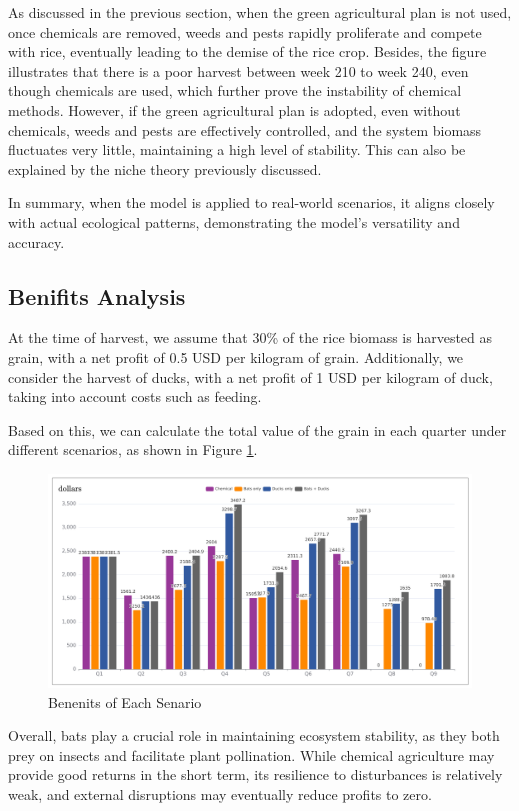 \documentclass{HZNUMCM}
\begin{document}
          As discussed in the previous section, 
          when the green agricultural plan is not used, once chemicals are removed, 
          weeds and pests rapidly proliferate and compete with rice, eventually leading to the demise of the rice crop. 
          Besides, the figure illustrates that there is a poor harvest between week 210 to week 240, even though chemicals are used, 
          which further prove the instability of chemical methods.
          However, if the green agricultural plan is adopted, even without chemicals, weeds and pests are effectively controlled, 
          and the system biomass fluctuates very little, maintaining a high level of stability. 
          This can also be explained by the niche theory previously discussed.
          
          In summary, when the model is applied to real-world scenarios, it aligns closely with actual ecological patterns, 
          demonstrating the model's versatility and accuracy.
      \subsection{Benifits Analysis}
        At the time of harvest, we assume that 30\% of the rice biomass is harvested as grain, 
        with a net profit of 0.5 USD per kilogram of grain. Additionally, we consider the harvest of ducks, 
        with a net profit of 1 USD per kilogram of duck, taking into account costs such as feeding. 
        
        Based on this, we can calculate the total value of the grain in each quarter under different scenarios, 
        as shown in Figure \ref{fig:Benefits}.
        \begin{figure}
          \centering
          \includegraphics[width=\linewidth]{images/benefits_processed.png}
          \caption{Benenits of Each Senario}
          \label{fig:Benefits}
        \end{figure}
        Overall, bats play a crucial role in maintaining ecosystem stability, 
        as they both prey on insects and facilitate plant pollination. 
        While chemical agriculture may provide good returns in the short term, 
        its resilience to disturbances is relatively weak, 
        and external disruptions may eventually reduce profits to zero. 
\end{document}
